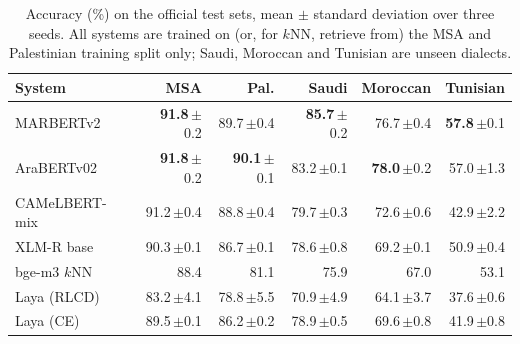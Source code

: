 \begin{table}[t]\centering\small\setlength{\tabcolsep}{4pt}\caption{Accuracy (\%) on the official test sets, mean $\pm$ standard deviation over three seeds. All systems are trained on (or, for $k$NN, retrieve from) the MSA and Palestinian training split only; Saudi, Moroccan and Tunisian are unseen dialects.}\label{tab:acc}
\begin{tabular}{lrrrrr}\toprule
System & MSA & Pal. & Saudi & Moroccan & Tunisian \\\midrule
MARBERTv2 & \textbf{91.8}\,{\scriptsize$\pm$0.2} & 89.7\,{\scriptsize$\pm$0.4} & \textbf{85.7}\,{\scriptsize$\pm$0.2} & 76.7\,{\scriptsize$\pm$0.4} & \textbf{57.8}\,{\scriptsize$\pm$0.1} \\
AraBERTv02 & \textbf{91.8}\,{\scriptsize$\pm$0.2} & \textbf{90.1}\,{\scriptsize$\pm$0.1} & 83.2\,{\scriptsize$\pm$0.1} & \textbf{78.0}\,{\scriptsize$\pm$0.2} & 57.0\,{\scriptsize$\pm$1.3} \\
CAMeLBERT-mix & 91.2\,{\scriptsize$\pm$0.4} & 88.8\,{\scriptsize$\pm$0.4} & 79.7\,{\scriptsize$\pm$0.3} & 72.6\,{\scriptsize$\pm$0.6} & 42.9\,{\scriptsize$\pm$2.2} \\
XLM-R base & 90.3\,{\scriptsize$\pm$0.1} & 86.7\,{\scriptsize$\pm$0.1} & 78.6\,{\scriptsize$\pm$0.8} & 69.2\,{\scriptsize$\pm$0.1} & 50.9\,{\scriptsize$\pm$0.4} \\
bge-m3 $k$NN & 88.4 & 81.1 & 75.9 & 67.0 & 53.1 \\
Laya (RLCD) & 83.2\,{\scriptsize$\pm$4.1} & 78.8\,{\scriptsize$\pm$5.5} & 70.9\,{\scriptsize$\pm$4.9} & 64.1\,{\scriptsize$\pm$3.7} & 37.6\,{\scriptsize$\pm$0.6} \\
Laya (CE) & 89.5\,{\scriptsize$\pm$0.1} & 86.2\,{\scriptsize$\pm$0.2} & 78.9\,{\scriptsize$\pm$0.5} & 69.6\,{\scriptsize$\pm$0.8} & 41.9\,{\scriptsize$\pm$0.8} \\
\bottomrule\end{tabular}\end{table}
